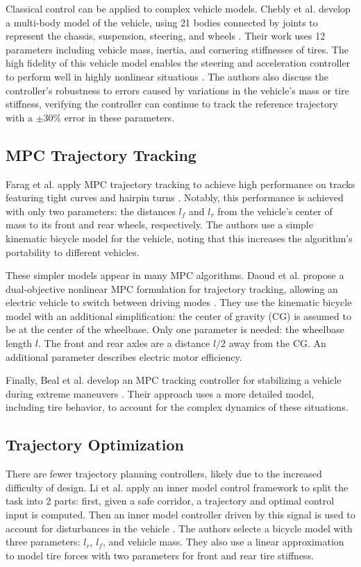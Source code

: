 \documentclass[letterpaper, 10 pt, conference]{ieeeconf}  %
\begin{document}
Classical control can be applied to complex vehicle models. Chebly et al. develop a multi-body model of the vehicle, using 21 bodies connected by joints to represent the chassis, suspension, steering, and wheels \cite{CHEBLY201712526}. Their work uses 12 parameters including vehicle mass, inertia, and cornering stiffnesses of tires. The high fidelity of this vehicle model enables the steering and acceleration controller to perform well in highly nonlinear situations \cite{CHEBLY201712526}. The authors also discuss the controller's robustness to errors caused by variations in the vehicle's mass or tire stiffness, verifying the controller can continue to track the reference trajectory with a $\pm30\%$ error in these parameters.

\subsection{MPC Trajectory Tracking}
Farag et al. apply MPC trajectory tracking to achieve high performance on tracks featuring tight curves and hairpin turns \cite{farag}. Notably, this performance is achieved with only two parameters: the distances $l_f$ and $l_r$ from the vehicle's center of mass to its front and rear wheels, respectively. The authors use a simple kinematic bicycle model for the vehicle, noting that this increases the algorithm's portability to different vehicles.

These simpler models appear in many MPC algorithms. Daoud et al. propose  a dual-objective nonlinear MPC formulation for trajectory tracking, allowing an electric vehicle to switch between driving modes \cite{pathfollowingMPC}. They use the kinematic bicycle model with an additional simplification: the center of gravity (CG) is assumed to be at the center of the wheelbase. Only one parameter is needed: the wheelbase length $l$. The front and rear axles are a distance $l/2$ away from the CG. An additional parameter describes electric motor efficiency. 

Finally, Beal et al. develop an MPC tracking controller for stabilizing a vehicle during extreme maneuvers \cite{beal}. Their approach uses a more detailed model, including tire behavior, to account for the complex dynamics of these situations.

\subsection{Trajectory Optimization}

There are fewer trajectory planning controllers, likely due to the increased difficulty of design. Li et al. apply an inner model control framework to split the task into 2 parts: first, given a safe corridor, a trajectory and optimal control input is computed. Then an inner model controller driven by this signal is used to account for disturbances in the vehicle \cite{pathtracking}. The authors selecte a bicycle model with three parameters: $l_r$, $l_f$, and vehicle mass. They also use a linear approximation to model tire forces with two parameters for front and rear tire stiffness.
\end{document}

